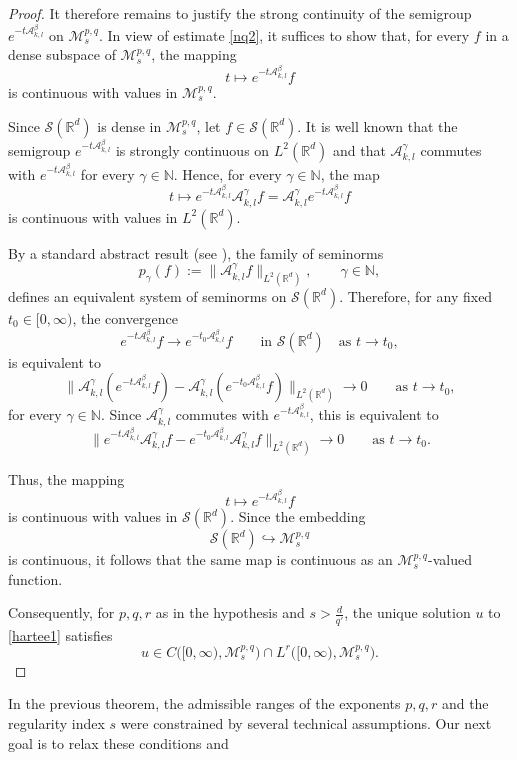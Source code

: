 \documentclass[12pt,reqno,a4paper]{amsart}
\numberwithin{equation}{section}
\theoremstyle{plain}
\theoremstyle{definition}
\theoremstyle{remark}
\def\M{\mathcal{M}}
\def \Ad{\mathcal{A}_{k,l}}
\def \M{{\mathcal M}}
\begin{document}
\begin{proof}
It therefore remains to justify the strong continuity of the semigroup
$e^{-t\Ad^{\beta}}$ on $\M^{p,q}_{s}$. In view of estimate \eqref{nq2},
it suffices to show that, for every $f$ in a dense subspace of
$\M^{p,q}_{s}$, the mapping
\[
t\longmapsto e^{-t\Ad^{\beta}}f
\]
is continuous with values in $\M^{p,q}_{s}$.

Since $\mathcal{S}(\mathbb{R}^{d})$ is dense in $\M^{p,q}_{s}$, let
$f\in\mathcal{S}(\mathbb{R}^{d})$. It is well known that the semigroup
$e^{-t\Ad^{\beta}}$ is strongly continuous on $L^{2}(\mathbb{R}^{d})$
and that $\Ad^{\gamma}$ commutes with $e^{-t\Ad^{\beta}}$ for every
$\gamma\in\mathbb{N}$. Hence, for every $\gamma\in\mathbb{N}$, the map
\[
t\longmapsto e^{-t\Ad^{\beta}}\Ad^{\gamma}f
=
\Ad^{\gamma}e^{-t\Ad^{\beta}}f
\]
is continuous with values in $L^{2}(\mathbb{R}^{d})$.

By a standard abstract result (see \cite[p.~194]{MR2668420}), the family
of seminorms
\[
p_{\gamma}(f)
:=
\|\Ad^{\gamma}f\|_{L^{2}(\mathbb{R}^{d})},
\qquad \gamma\in\mathbb{N},
\]
defines an equivalent system of seminorms on
$\mathcal{S}(\mathbb{R}^{d})$. Therefore, for any fixed
$t_{0}\in[0,\infty)$, the convergence
\[
e^{-t\Ad^{\beta}}f
\longrightarrow
e^{-t_{0}\Ad^{\beta}}f
\qquad
\text{in }\mathcal{S}(\mathbb{R}^{d})
\quad \text{as } t\to t_{0},
\]
is equivalent to
\[
\|\Ad^{\gamma}(e^{-t\Ad^{\beta}}f)
-
\Ad^{\gamma}(e^{-t_{0}\Ad^{\beta}}f)\|_{L^{2}(\mathbb{R}^{d})}
\longrightarrow 0
\qquad \text{as } t\to t_{0},
\]
for every $\gamma\in\mathbb{N}$. Since $\Ad^{\gamma}$ commutes with
$e^{-t\Ad^{\beta}}$, this is equivalent to
\[
\|e^{-t\Ad^{\beta}}\Ad^{\gamma}f
-
e^{-t_{0}\Ad^{\beta}}\Ad^{\gamma}f\|_{L^{2}(\mathbb{R}^{d})}
\longrightarrow 0
\qquad \text{as } t\to t_{0}.
\]

Thus, the mapping
\[
t\longmapsto e^{-t\Ad^{\beta}}f
\]
is continuous with values in $\mathcal{S}(\mathbb{R}^{d})$. Since the
embedding
\[
\mathcal{S}(\mathbb{R}^{d})
\hookrightarrow
\M^{p,q}_{s}
\]
is continuous, it follows that the same map is continuous as an
$\M^{p,q}_{s}$-valued function.

Consequently, for $p,q,r$ as in the hypothesis and
$s>\frac{d}{q'}$, the unique solution $u$ to \eqref{hartee1} satisfies
\[
u
\in
C\bigl([0,\infty),\M^{p,q}_{s}\bigr)
\cap
L^{r}\bigl([0,\infty),\M^{p,q}_{s}\bigr).
\]\end{proof}
In the previous theorem, the admissible ranges of the exponents
$p,q,r$ and the regularity index $s$ were constrained by several
technical assumptions. Our next goal is to relax these conditions and
\end{document}
